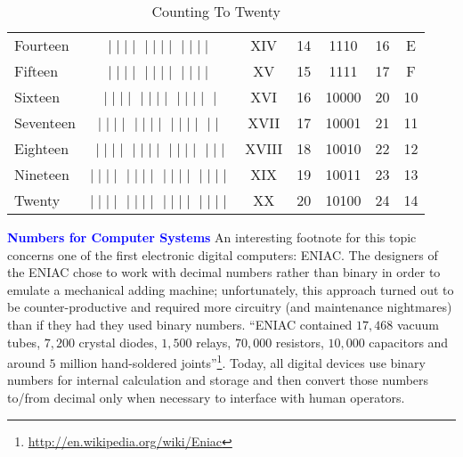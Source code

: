 \begin{table}[H]
\begin{center}
\begin{tabular}{lcccccc}
      Fourteen  & \sout{$\mid\mid\mid\mid$}
      \sout{$\mid\mid\mid\mid$}
      $\mid\mid\mid\mid$                        & XIV   & 14 & 1110  & 16 & E \\ 
      Fifteen   & \sout{$\mid\mid\mid\mid$}
      \sout{$\mid\mid\mid\mid$}
      \sout{$\mid\mid\mid\mid$}             & XV    & 15 & 1111  & 17 & F \\ 
      Sixteen   & \sout{$\mid\mid\mid\mid$}
      \sout{$\mid\mid\mid\mid$}
      \sout{$\mid\mid\mid\mid$}
      $\mid$                                    & XVI   & 16 & 10000 & 20 & 10 \\ 
      Seventeen & \sout{$\mid\mid\mid\mid$}
      \sout{$\mid\mid\mid\mid$}
      \sout{$\mid\mid\mid\mid$}
      $\mid\mid$                                & XVII  & 17 & 10001 & 21 & 11 \\ 
      Eighteen  & \sout{$\mid\mid\mid\mid$}
      \sout{$\mid\mid\mid\mid$}
      \sout{$\mid\mid\mid\mid$}
      $\mid\mid\mid$                            & XVIII & 18 & 10010 & 22 & 12 \\ 
      Nineteen  & \sout{$\mid\mid\mid\mid$}
      \sout{$\mid\mid\mid\mid$}
      \sout{$\mid\mid\mid\mid$}
      $\mid\mid\mid\mid$                        & XIX   & 19 & 10011 & 23 & 13 \\ 
      Twenty    & \sout{$\mid\mid\mid\mid$}
      \sout{$\mid\mid\mid\mid$}
      \sout{$\mid\mid\mid\mid$}
      \sout{$\mid\mid\mid\mid$}             & XX    & 20 & 10100 & 24 & 14 \\ 
      \hline
    \end{tabular} 
  \end{center}
  \caption{Counting To Twenty}
  \label{MF:tab:counting_to_twenty}
\end{table}

\medskip %
\begin{tcolorbox}[colback=blue!5!white,colframe=blue!75!black]
  \textcolor{blue}{\textbf{Numbers for Computer Systems}}
  \tcblower
  An interesting footnote for this topic concerns one of the first electronic digital computers: ENIAC. The designers of the ENIAC chose to work with decimal numbers rather than binary in order to emulate a mechanical adding machine; unfortunately, this approach turned out to be counter-productive and required more circuitry (and maintenance nightmares) than if they had they used binary numbers. ``ENIAC contained $ 17,468 $ vacuum tubes, $ 7,200 $ crystal diodes, $ 1,500 $ relays, $ 70,000 $ resistors, $ 10,000 $ capacitors and around $ 5 $ million hand-soldered joints''\footnote{\url{http://en.wikipedia.org/wiki/Eniac}}. Today, all digital devices use binary numbers for internal calculation and storage and then convert those numbers to/from decimal only when necessary to interface with human operators.
\end{tcolorbox}

